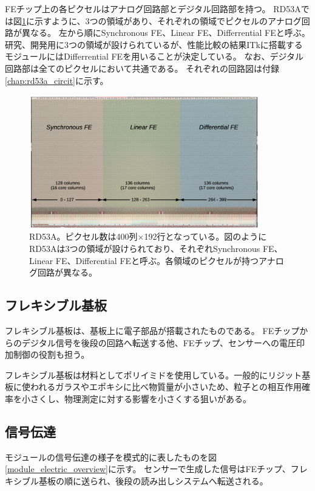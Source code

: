 FEチップ上の各ピクセルはアナログ回路部とデジタル回路部を持つ。
RD53Aでは図\ref{fechip_rd53a}に示すように、3つの領域があり、それぞれの領域でピクセルのアナログ回路が異なる。
左から順にSynchronous FE、Linear FE、Differrential FEと呼ぶ。
研究、開発用に3つの領域が設けられているが、性能比較の結果ITkに搭載するモジュールにはDifferrential FEを用いることが決定している。
なお、デジタル回路部は全てのピクセルにおいて共通である。
それぞれの回路図は付録\ref{chap:rd53a_circit}に示す。

\begin{figure}[bpt]\centering
\includegraphics[width=10cm]{./fechip_rd53a.png}
\caption[RD53A]{RD53A\cite{2-1}。ピクセル数は400列$\times$192行となっている。図のようにRD53Aは3つの領域が設けられており、それぞれSynchronous FE、Linear FE、Differential FEと呼ぶ。各領域のピクセルが持つアナログ回路が異なる。}
\label{fechip_rd53a}
\end{figure}

\subsection{フレキシブル基板}
フレキシブル基板は、基板上に電子部品が搭載されたものである。
FEチップからのデジタル信号を後段の回路へ転送する他、FEチップ、センサーへの電圧印加制御の役割も担う。

フレキシブル基板は材料としてポリイミドを使用している。一般的にリジット基板に使われるガラスやエポキシに比べ物質量が小さいため、粒子との相互作用確率を小さくし、物理測定に対する影響を小さくする狙いがある。

\subsection{信号伝達}
モジュールの信号伝達の様子を模式的に表したものを図\ref{module_electric_overview}に示す。
センサーで生成した信号はFEチップ、フレキシブル基板の順に送られ、後段の読み出しシステムへ転送される。

